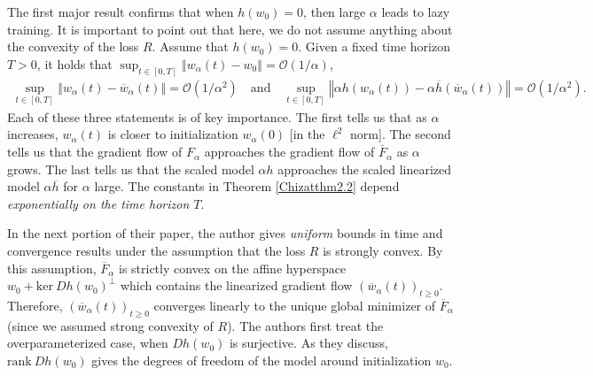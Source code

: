 \documentclass{article}
\newenvironment{manualtheorem}[1]{%
  \renewcommand\themanualtheoreminner{#1}%
  \manualtheoreminner
}{\endmanualtheoreminner}
\begin{document}
The first major result confirms that when $h(w_0) = 0$, then large $\alpha$ leads to lazy training. It is important to point out that here, we do not assume anything about the convexity of the loss $R$.
\begin{manualtheorem}{2.2}\label{Chizatthm2.2}
Assume that $h(w_0) = 0$. Given a fixed time horizon $T > 0$, it holds that $\sup_{t \in [0, T]} \left\Vert w_{\alpha}(t) - w_0 \right\Vert = \mathcal{O}(1/\alpha)$,
\begin{align*}
    \sup_{t \in [0, T]} \left\Vert w_{\alpha}(t) - \overline{w}_{\alpha}(t) \right\Vert = \mathcal{O}(1/\alpha^2) \quad \text{and} \quad  \sup_{t \in [0, T]} \left\Vert \alpha h(w_{\alpha}(t)) - \alpha \overline{h}(\overline{w}_{\alpha}(t)) \right\Vert = \mathcal{O}(1/\alpha^2).
\end{align*}
\end{manualtheorem}
Each of these three statements is of key importance. The first tells us that as $\alpha$ increases, $w_{\alpha}(t)$ is closer to initialization $w_{\alpha}(0)$ [in the $\ell^2$ norm]. The second tells us that the gradient flow of $F_{\alpha}$ approaches the gradient flow of $\overline{F}_{\alpha}$ as $\alpha$ grows. The last tells us that the scaled model $\alpha h$ approaches the scaled linearized model $\alpha \overline{h}$ for $\alpha$ large. The constants in Theorem \ref{Chizatthm2.2} depend \textit{exponentially on the time horizon $T$}.

In the next portion of their paper, the author gives \textit{uniform} bounds in time and convergence results under the assumption that the loss $R$ is strongly convex. By this assumption, $\overline{F}_{\alpha}$ is strictly convex on the affine hyperspace $w_0 + \text{ker} \ Dh(w_0)^{\perp}$ which contains the linearized gradient flow $(\overline{w}_{\alpha}(t))_{t \geq 0}$. Therefore, $(\overline{w}_{\alpha}(t))_{t \geq 0}$ converges linearly to the unique global minimizer of $\overline{F}_{\alpha}$ (since we assumed strong convexity of $R$). The authors first treat the overparameterized case, when $Dh(w_0)$ is surjective. As they discuss, $\text{rank} \ Dh(w_0)$ gives the degrees of freedom of the model around initialization $w_0$. 
\end{document}
